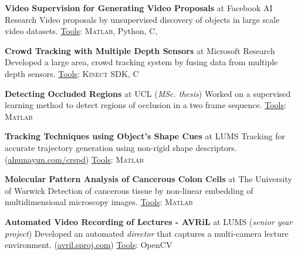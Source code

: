 \documentclass[10pt,twoside,a4paper]{article}
\newif\ifdetail
\newcommand\CPP{C\nolinebreak[4]\hspace{-.05em}\raisebox{.4ex}{\relsize{-3}{\textbf{++}}}}
\begin{document}
\textbf{Video Supervision for Generating Video Proposals} at Facebook AI Research \newline
\ifdetail Research on generating video \else Video \fi proposals by unsupervised discovery of objects in large scale video datasets. \underline{Tools}: \textsc{Matlab}, Python, \CPP, \ifdetail Javascript, PHP \fi

\ifdetail
\textbf{Object Proposals for CT Images} at Georgia Institute of Technology (as \textit{Ph.D. student}) \newline
Supervising a project for generating segmentation proposals in 3D CT scans, leading to detection of organs.
\fi

\textbf{Crowd Tracking with Multiple Depth Sensors} at Microsoft Research \newline
Developed a large area, crowd tracking system by fusing data from multiple depth sensors. \underline{Tools}: \textsc{Kinect SDK}, \CPP

\textbf{Detecting Occluded Regions} at UCL (\textit{MSc. thesis})\newline
Worked on a supervised learning method to detect regions of occlusion in a two frame sequence. \underline{Tools}: \textsc{Matlab}

\textbf{Tracking Techniques using Object's Shape Cues} at LUMS \newline
\ifdetail Researched tracking techniques for accurate generation of trajectories using object's non-rigid shape descriptors, resilient to occlusion. This was partly funded by NSF. \else Tracking for accurate trajectory generation using non-rigid shape descriptors. \fi (\href{http://ahumayun.com/crspd.html}{ahumayun.com/crspd}) \underline{Tools}: \textsc{Matlab}

\textbf{Molecular Pattern Analysis of Cancerous Colon Cells} at The University of Warwick \newline
\ifdetail A multi-disciplinary project for the detection of cancerous tissue. We developed registration and non-linear embedding techniques for analysis of tissues from a multidimensional imaging process. \else Detection of cancerous tissue by non-linear embedding of multidimensional microscopy images. \fi \underline{Tools}: \textsc{Matlab}

\textbf{Automated Video Recording of Lectures - AVRiL} at LUMS (\textit{senior year project}) \newline
Developed an automated \textit{director} that captures a multi-camera lecture environment. %
(\href{http://avril.sproj.com}{avril.sproj.com}) \underline{Tools}: OpenCV%
\end{document}
